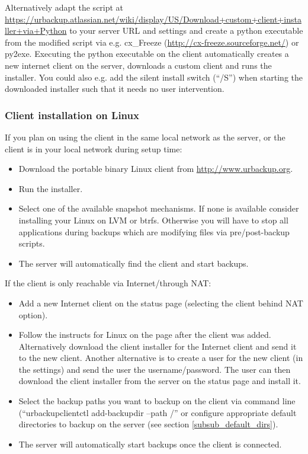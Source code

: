 \documentclass[a4paper,10pt]{article}
\begin{document}
Alternatively adapt the script at \url{https://urbackup.atlassian.net/wiki/display/US/Download+custom+client+installer+via+Python} to your server URL and settings
and create a python executable from the modified script via e.g. cx\_Freeze (\url{http://cx-freeze.sourceforge.net/}) or py2exe. Executing the python
executable on the client automatically creates a new internet client on the server, downloads a custom client and runs the installer.
You could also e.g. add the silent install switch (``/S'') when starting the downloaded installer such that it needs no user intervention.

\subsubsection{Client installation on Linux}

\noindent If you plan on using the client in the same local network as the server, or the client is in your local network during setup time:

\begin{itemize}
\item Download the portable binary Linux client from \url{http://www.urbackup.org}.
\item Run the installer.
\item Select one of the available snapshot mechanisms. If none is available consider installing your Linux on LVM or btrfs. Otherwise you will have to stop all applications during backups which are modifying files via pre/post-backup scripts.
\item The server will automatically find the client and start backups.
\end{itemize}

\noindent If the client is only reachable via Internet/through NAT:

\begin{itemize}
  \item Add a new Internet client on the status page (selecting the client behind NAT option).
  \item Follow the instructs for Linux on the page after the client was added. Alternatively download the
  	client installer for the Internet client and send it to the new client. Another alternative is to create
  	a user for the new client (in the settings) and send the user the username/password. The user can then
  	download the client installer from the server on the status page and install it.
  \item Select the backup paths you want to backup on the client via command line
  (``urbackupclientctl add-backupdir --path /'' or configure appropriate default directories
  to backup on the server (see section \ref{subsub_default_dirs}).
  \item The server will automatically start backups once the client is connected.
\end{itemize}
\end{document}
